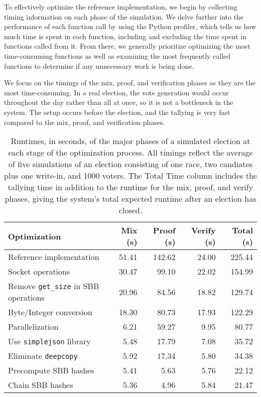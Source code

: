 To effectively optimize the reference implementation, we begin by collecting timing information on each phase of the simulation. We delve further into the performance of each function call by using the Python profiler, which tells us how much time is spent in each function, including and excluding the time spent in functions called from it. From there, we generally prioritize optimizing the most time-consuming functions as well as examining the most frequently called functions to determine if any unnecessary work is being done.

We focus on the timings of the mix, proof, and verification phases as they are the most time-consuming. In a real election, the vote generation would occur throughout the day rather than all at once, so it is not a bottleneck in the system. The setup occurs before the election, and the tallying is very fast compared to the mix, proof, and verification phases.

\begin{table}[htbp]
\centering
\begin{tabular}{l | r | r | r || r}
  \textbf{Optimization} & \textbf{Mix (s)} & \textbf{Proof (s)} & \textbf{Verify (s)} & \textbf{Total (s)} \\
  \hline
  Reference implementation & 51.41 & 142.62 & 24.00 & 225.44 \\
  Socket operations & 30.47 & 99.10 & 22.02 & 154.99 \\
  Remove \texttt{get\_size} in SBB operations & 20.96 & 84.56 & 18.82 & 129.74 \\
  Byte/Integer conversion & 18.30 & 80.73 & 17.93 & 122.29 \\
  Parallelization & 6.21 & 59.27 & 9.95 & 80.77 \\
  Use \texttt{simplejson} library & 5.48 & 17.79 & 7.08 & 35.72 \\
  Eliminate \texttt{deepcopy} & 5.92 & 17.34 & 5.80 & 34.38 \\
  Precompute SBB hashes & 5.41 & 5.63 & 5.76 & 22.12 \\
  Chain SBB hashes & 5.36 & 4.96 & 5.84 & 21.47
\end{tabular}
\caption[Election runtime at each stage of optimization]{Runtimes, in seconds, of the major phases of a simulated election at each stage of the optimization process. All timings reflect the average of five simulations of an election consisting of one race, two candiates plus one write-in, and 1000 voters. The Total Time column includes the tallying time in addition to the runtime for the mix, proof, and verify phases, giving the system's total expected runtime after an election has closed.}
\label{table:perf:optimizations}
\end{table}


